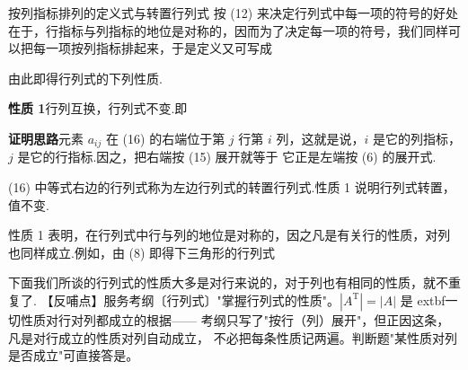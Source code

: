 \begin{fdeep}{按列指标排列的定义式与转置行列式}
按 (12) 来决定行列式中每一项的符号的好处在于，行指标与列指标的地位是对称的，因而为了决定每一项的符号，我们同样可以把每一项按列指标排起来，于是定义又可写成

由此即得行列式的下列性质.

\textbf{性质 1}\quad 行列互换，行列式不变.即

\textbf{证明思路}\quad 元素 $a_{ij}$ 在 (16) 的右端位于第 $j$ 行第 $i$ 列，这就是说，$i$ 是它的列指标，$j$ 是它的行指标.因之，把右端按 (15) 展开就等于
它正是左端按 (6) 的展开式.

(16) 中等式右边的行列式称为左边行列式的转置行列式.性质 1 说明行列式转置，值不变.

性质 1 表明，在行列式中行与列的地位是对称的，因之凡是有关行的性质，对列也同样成立.例如，由 (8) 即得下三角形的行列式

下面我们所谈的行列式的性质大多是对行来说的，对于列也有相同的性质，就不重复了.
【反哺点】服务考纲〔行列式〕"掌握行列式的性质"。$|A^{\mathrm T}|=|A|$ 是	extbf{一切性质对行对列都成立}的根据——
考纲只写了"按行（列）展开"，但正因这条，凡是对行成立的性质对列自动成立，
不必把每条性质记两遍。判断题"某性质对列是否成立"可直接答是。
\end{fdeep}

